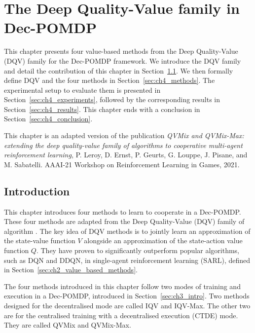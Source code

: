 \chapter{The Deep Quality-Value family in Dec-POMDP}\label{ch:qvmix}
\begin{chapter_outline}

This chapter presents four value-based methods from the Deep Quality-Value (DQV) family for the Dec-POMDP framework.
We introduce the DQV family and detail the contribution of this chapter in Section~\ref{sec:ch4_intro}.
We then formally define DQV and the four methods in Section~\ref{sec:ch4_methods}.
The experimental setup to evaluate them is presented in Section~\ref{sec:ch4_experiments}, followed by the corresponding results in Section~\ref{sec:ch4_results}.
This chapter ends with a conclusion in Section~\ref{sec:ch4_conclusion}.

This chapter is an adapted version of the publication \citep{leroy2020qvmix} \textit{QVMix and QVMix-Max: extending the deep quality-value family of algorithms to cooperative multi-agent reinforcement learning}, P. Leroy, D. Ernst, P. Geurts, G. Louppe, J. Pisane, and M. Sabatelli. AAAI-21 Workshop on Reinforcement Learning in Games, 2021.

\end{chapter_outline}


\section{Introduction} \label{sec:ch4_intro}

This chapter introduces four methods to learn to cooperate in a Dec-POMDP.
These four methods are adapted from the Deep Quality-Value (DQV) family of algorithm \citep{sabatelli2020deep}.
The key idea of DQV methods is to jointly learn an approximation of the state-value function $V$ alongside an approximation of the state-action value function $Q$.
They have proven to significantly outperform popular algorithms, such as DQN and DDQN, in single-agent reinforcement learning (SARL), defined in Section~\ref{sec:ch2_value_based_methods}.

The four methods introduced in this chapter follow two modes of training and execution in a Dec-POMDP, introduced in Section~\ref{sec:ch3_intro}.
Two methods designed for the decentralised mode are called IQV and IQV-Max.
The other two are for the centralised training with a decentralised execution (CTDE) mode. 
They are called QVMix and QVMix-Max.

